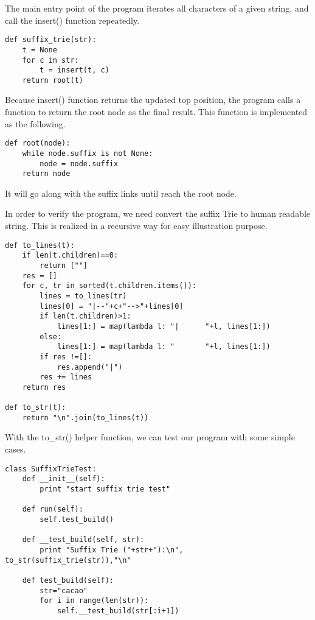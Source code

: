 \documentclass{article}
\begin{document}
The main entry point of the program iterates all characters of a given string, and 
call the insert() function repeatedly.

\begin{lstlisting}
def suffix_trie(str):
    t = None
    for c in str:
        t = insert(t, c)
    return root(t)
\end{lstlisting}

Because insert() function returns the updated top position, the program calls
a function to return the root node as the final result. This function is implemented
as the following.

\begin{lstlisting}
def root(node):
    while node.suffix is not None:
        node = node.suffix
    return node
\end{lstlisting}

It will go along with the suffix links until reach the root node.

In order to verify the program, we need convert the suffix Trie to human readable
string. This is realized in a recursive way for easy illustration purpose.

\begin{lstlisting}
def to_lines(t):
    if len(t.children)==0:
        return [""]
    res = []
    for c, tr in sorted(t.children.items()):
        lines = to_lines(tr)
        lines[0] = "|--"+c+"-->"+lines[0]
        if len(t.children)>1:
            lines[1:] = map(lambda l: "|      "+l, lines[1:])
        else:
            lines[1:] = map(lambda l: "       "+l, lines[1:])
        if res !=[]:
            res.append("|")
        res += lines
    return res

def to_str(t):
    return "\n".join(to_lines(t))
\end{lstlisting}

With the to\_str() helper function, we can test our program with
some simple cases.

\begin{lstlisting}
class SuffixTrieTest:
    def __init__(self):
        print "start suffix trie test"

    def run(self):
        self.test_build()

    def __test_build(self, str):
        print "Suffix Trie ("+str+"):\n", to_str(suffix_trie(str)),"\n"

    def test_build(self):
        str="cacao"
        for i in range(len(str)):
            self.__test_build(str[:i+1])
\end{lstlisting}
\end{document}
